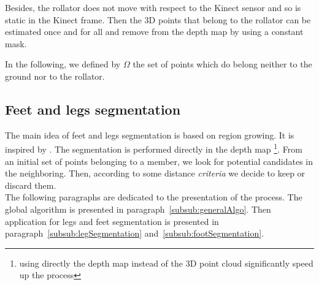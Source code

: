 \documentclass[letterpaper, 10 pt, conference]{ieeeconf}
\newcommand{\CDOK}[2]{{#1}} %
\begin{document}
Besides, the rollator does not move with respect to the Kinect sensor and so is static in the Kinect frame. Then the 3D points that belong to the rollator can be estimated once and for all and remove from the depth map by using a constant mask.

In the following, we defined by $\Omega$ the set of points which do belong neither to the ground nor to the rollator. 


\subsection{Feet and legs segmentation}

The main idea of feet and legs segmentation is based on region growing. It is inspired by \cite{aaa}. \CDOK{The segmentation is performed directly in the depth map \footnote{using directly the depth map instead of the 3D point cloud significantly speed up the process}}{}. From \CDOK{an initial}{a current} set of points \CDOK{belonging to}{of} a member, we look for potential candidates in the neighboring\CDOK{. Then, according to some distance \textit{criteria} we decide to keep or discard them. \\}{ and then validate it or not. } The following paragraphs are dedicated to the presentation of the process. The global algorithm is presented in paragraph~\ref{subsub:generalAlgo}. Then application for legs and feet segmentation is presented in paragraph~\ref{subsub:legSegmentation} and~\ref{subsub:footSegmentation}.
\end{document}
